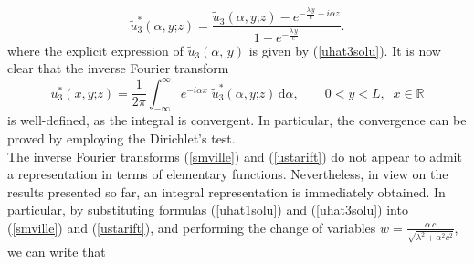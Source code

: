 \documentclass{article}
\begin{document}
\begin{equation}\widetilde{u}_3^*(\alpha,y\mathord{;}z)=\frac{\widetilde{u}_3(\alpha,y\mathord{;}z)-e^{-\frac{\lambda\,y}{c}+i\alpha z}}{1-e^{-\frac{\lambda\,y}{c}}}.\label{singularexplicitfouriercontinuous}\end{equation}
where the explicit expression of  $\widetilde{u}_3(\alpha,\,y)$ is given by (\ref{uhat3solu}). It is now clear that the inverse Fourier transform 
\begin{equation}\label{ustarift}u_3^*(x,y\mathord{;}z)=\frac{1}{2\pi}\int_{-\infty}^{\infty}e^{-i\alpha x}\;\widetilde{u}_3^*(\alpha,y\mathord{;}z)\,\mathrm{d}\alpha,\qquad 0<y<L,\;\;x\in\mathbb{R}\end{equation} is well-defined, as the integral is convergent. In particular, the convergence can be proved by employing the Dirichlet's test.\\
\noindent The inverse Fourier transforms (\ref{smville}) and (\ref{ustarift}) do not appear to admit a representation in terms of elementary functions. Nevertheless, in view on the results presented so far, an integral representation is immediately obtained. In particular, by substituting formulas  (\ref{uhat1solu}) and (\ref{uhat3solu}) into (\ref{smville}) and (\ref{ustarift}), and performing the change of variables $w=\frac{\alpha\,c}{\sqrt{\lambda^2+\alpha^2c^2}}$, we can write that
\end{document}
